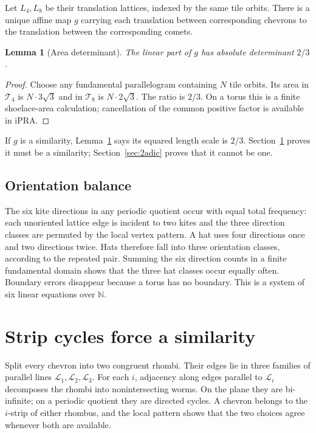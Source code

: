 \documentclass[11pt]{article}
\newtheorem{lemma}[theorem]{Lemma}
\newcommand{\iPRA}{\mathrm{iPRA}}
\newcommand{\N}{\mathbb N}
\begin{document}
Let $L_4,L_8$ be their translation lattices, indexed by the same tile orbits.  There is a
unique affine map $g$ carrying each translation between corresponding chevrons to the
translation between the corresponding comets.

\begin{lemma}[Area determinant]\label{lem:area}
The linear part of $g$ has absolute determinant $2/3$.
\end{lemma}

\begin{proof}
Choose any fundamental parallelogram containing $N$ tile orbits.  Its area in
$\mathcal T_4$ is $N\cdot3\sqrt3$ and in $\mathcal T_8$ is
$N\cdot2\sqrt3$.  The ratio is $2/3$.  On a torus this is a finite shoelace-area
calculation; cancellation of the common positive factor is available in $\iPRA$.
\end{proof}

If $g$ is a similarity, Lemma~\ref{lem:area} says its squared length scale is $2/3$.
Section~\ref{sec:strip} proves it must be a similarity; Section~\ref{sec:2adic} proves that
it cannot be one.

\subsection{Orientation balance}
The six kite directions in any periodic quotient occur with equal total frequency:
each unoriented lattice edge is incident to two kites and the three direction classes are
permuted by the local vertex pattern.  A hat uses four directions once and two directions
twice.  Hats therefore fall into three orientation classes, according to the repeated
pair.  Summing the six direction counts in a finite fundamental domain shows that the
three hat classes occur equally often.  Boundary errors disappear because a torus has no
boundary.  This is a system of six linear equations over $\N$.

\section{Strip cycles force a similarity}\label{sec:strip}

Split every chevron into two congruent rhombi.  Their edges lie in three families of
parallel lines $\mathcal L_1,\mathcal L_2,\mathcal L_3$.  For each $i$, adjacency along
edges parallel to $\mathcal L_i$ decomposes the rhombi into nonintersecting worms.  On the
plane they are bi-infinite; on a periodic quotient they are directed cycles.  A chevron
belongs to the $i$-strip of either rhombus, and the local pattern shows that the two
choices agree whenever both are available.
\end{document}
